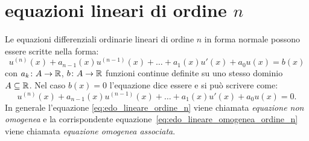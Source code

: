 \section{equazioni lineari di ordine $n$}
\label{sec:edo_lineari}

Le equazioni differenziali ordinarie lineari di ordine $n$ in forma normale possono essere scritte nella forma:
\begin{equation}\label{eq:edo_lineare_ordine_n}
  u^{(n)}(x) + a_{n-1}(x) u^{(n-1)}(x) + \dots + a_1(x) u'(x) + a_0 u(x) = b(x)
\end{equation}
con $a_k\colon A \to \mathbb R$, $b\colon A\to \mathbb R$ funzioni continue definite su uno stesso dominio $A\subseteq \mathbb R$.
Nel caso $b(x) = 0$ l'equazione dice essere 
e si può scrivere come:
\begin{equation}\label{eq:edo_lineare_omogenea_ordine_n}
  u^{(n)}(x) + a_{n-1}(x) u^{(n-1)}(x) + \dots + a_1(x) u'(x) + a_0 u(x) = 0.
\end{equation}
In generale l'equazione \eqref{eq:edo_lineare_ordine_n}
viene chiamata \emph{equazione non omogenea}
e la corrispondente equazione~\eqref{eq:edo_lineare_omogenea_ordine_n}
viene chiamata \emph{equazione omogenea associata}.

